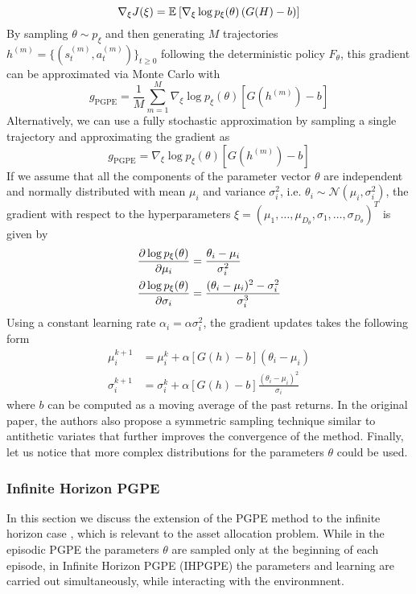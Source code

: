 \begin{equation}
	\nabla_\xi J(\xi) = \mathbb{E}_{}\left[ \nabla_\xi \log p_\xi(\theta)\left(G(H) - b\right) \right]
\end{equation}
By sampling $\theta \sim p_\xi$ and then generating $M$ trajectories $h^{(m)} = 
\{(s_t^{(m)}, a_t^{(m)})\}_{t \geq 0}$ following the deterministic policy
$F_\theta$, this gradient can be approximated via Monte Carlo with 
\begin{equation}
	g_{\text{PGPE}} = \frac{1}{M} \sum^{M}_{m=1} \nabla_\xi \log p_\xi(\theta) 
	\left[G\left(h^{(m)}\right)-b\right] 
\end{equation}
Alternatively, we can use a fully stochastic approximation by sampling a single
trajectory and approximating the gradient as 
\begin{equation}
	g_{\text{PGPE}} = \nabla_\xi \log p_\xi(\theta) \left[G\left(h^{(m)}\right)-b\right] 
\end{equation}
If we assume that all the components of the parameter vector $\theta$ are
independent and normally distributed with mean $\mu_i$ and variance
$\sigma_i^2$, i.e. $\theta_i \sim \mathcal{N}(\mu_i, \sigma_i^2)$, the gradient
with respect to the hyperparameters $\xi = (\mu_1, \ldots, \mu_{D_\theta}, 
\sigma_1, \ldots, \sigma_{D_\theta})^T$ is given by 
\begin{equation}
	\begin{split}
		\frac{\partial \log p_\xi(\theta)}{\partial \mu_i} &= \frac{\theta_i -
		\mu_i}{\sigma_i^2}\\	
		\frac{\partial \log p_\xi(\theta)}{\partial \sigma_i} &= \frac{(\theta_i - \mu_i)^2 -
		\sigma_i^2}{\sigma_i^3}
	\end{split}
\end{equation}
Using a constant learning rate $\alpha_i = \alpha \sigma_i^2$, the gradient
updates takes the following form
\begin{equation}
	\begin{split}
		\mu_i^{k+1} &= \mu_i^k + \alpha \left[G(h) - b\right] (\theta_i - \mu_i)\\
		\sigma_i^{k+1} &= \sigma_i^k + \alpha \left[G(h) - b\right] 
		\frac{(\theta_i -\mu_i)^2}{\sigma_i}
	\end{split}
\end{equation}
where $b$ can be computed as a moving average of the past returns. In the
original paper, the authors also propose a symmetric sampling technique similar
to antithetic variates that further improves the convergence of the method.
Finally, let us notice that more complex distributions for the parameters
$\theta$ could be used. 

\subsubsection{Infinite Horizon PGPE}
In this section we discuss the extension of the PGPE method to the infinite
horizon case \cite{sehnke2012parameter}, which is relevant to the asset 
allocation problem. While in the episodic PGPE the parameters $\theta$ are 
sampled only at the beginning of each episode, in Infinite Horizon PGPE
(IHPGPE) the parameters and learning are carried out simultaneously, while
interacting with the environmnent. 

